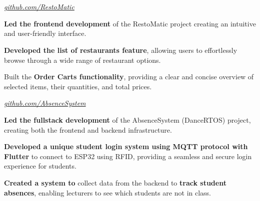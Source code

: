 \documentclass[../main.tex]{subfiles}
\begin{document}
\section{}

\begin{twocolentry}{
		\small
		\textit{\href{https://github.com/SistemBasisData2023/RestoMatic}{github.com/RestoMatic}}}
\end{twocolentry}

\vspace{0.10 cm}
\begin{onecolentry}
	\begin{highlights}
		\item \textbf{Led the frontend development} of the RestoMatic project creating an intuitive and user-friendly interface.
		\item \textbf{Developed the list of restaurants feature}, allowing users to effortlessly browse through a wide range of restaurant options.
		\item Built the \textbf{Order Carts functionality}, providing a clear and concise overview of selected items, their quantities, and total prices.
	\end{highlights}
\end{onecolentry}


\vspace{0.2 cm}

\begin{twocolentry}{
		\small

		\textit{\href{https://github.com/cattyman919/AbsenceSystem/tree/main}{github.com/AbsenceSystem}}}
\end{twocolentry}

\vspace{0.10 cm}
\begin{onecolentry}
	\begin{highlights}
		\item \textbf{Led the fullstack development} of the AbsenceSystem (DanceRTOS) project, creating both the frontend and backend infrastructure.
		\item \textbf{Developed a unique student login system using MQTT protocol with Flutter} to connect to ESP32 using RFID, providing a seamless and secure login experience for students.
		\item \textbf{Created a system to} collect data from the backend to \textbf{track student absences}, enabling lecturers to see which students are not in class.
	\end{highlights}
\end{onecolentry}
\end{document}
